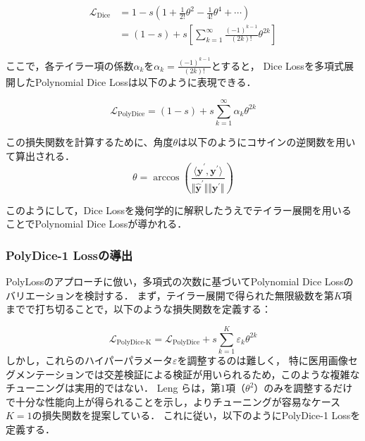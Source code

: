 \documentclass[10pt, a4paper, twocolumn]{jarticle}
\begin{document}
\begin{equation}
  \begin{aligned}
  \mathcal{L}_{\text{Dice}} &= 1 - s \left(1 + \frac{1}{2!} \theta ^ 2 - \frac{1}{4!} \theta ^ 4 + \cdots\right) \\
  &= (1 - s) + s \left[\sum_{k = 1}^{\infty} \frac{(-1) ^ {k - 1}}{(2k)!} \theta ^ {2k}\right]
\end{aligned}
\end{equation}

ここで，各テイラー項の係数$\alpha_k$を$\alpha_k = \frac{(-1)^{k-1}}{(2k)!}$とすると，
Dice Lossを多項式展開したPolynomial Dice Lossは以下のように表現できる．

\begin{equation}
  \mathcal{L}_{\text{PolyDice}} = (1 - s) + s \sum_{k = 1}^{\infty} \alpha_k \theta ^ {2k}
\end{equation}

この損失関数を計算するために、角度$\theta$は以下のようにコサインの逆関数を用いて算出される．
\begin{equation}
  \theta = \arccos{\left(\frac{\langle \hat{\mathbf{y}} ^ {\prime}, {\mathbf{y}} ^ {\prime} \rangle}{\Vert \hat{\mathbf{y}} ^ {\prime} \Vert \Vert {\mathbf{y}} ^ {\prime} \Vert}\right)}
\end{equation}

このようにして，Dice Lossを幾何学的に解釈したうえでテイラー展開を用いることでPolynomial Dice Lossが導かれる．


\subsubsection{PolyDice-1 Lossの導出}
PolyLossのアプローチに倣い，多項式の次数に基づいてPolynomial Dice Lossのバリエーションを検討する．
まず，テイラー展開で得られた無限級数を第$K$項までで打ち切ることで，以下のような損失関数を定義する：

\begin{equation}
  \mathcal{L}_{\text{PolyDice-K}} = \mathcal{L}_{\text{PolyDice}} + s \sum_{k=1}^{K} \varepsilon_k \theta^{2k}
\end{equation}
%
%
しかし，これらのハイパーパラメータ$\varepsilon$を調整するのは難しく，
特に医用画像セグメンテーションでは交差検証による検証が用いられるため，このような複雑なチューニングは実用的ではない．
Leng らは，第$1$項（$\theta ^ 2$）のみを調整するだけで十分な性能向上が得られることを示し，よりチューニングが容易なケース$K=1$の損失関数を提案している．
これに従い，以下のようにPolyDice-1 Lossを定義する．
\end{document}
